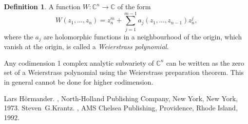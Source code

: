 \documentclass[12pt]{article}
\theoremstyle{theorem}
\theoremstyle{definition}
\newtheorem*{defn}{Definition}
\theoremstyle{remark}
\begin{document}
\begin{defn}
A function $W\colon {\mathbb{C}}^n \to {\mathbb{C}}$ of the form
\begin{equation*}
W(z_1,\ldots,z_n) = z_n^m + \sum_{j=1}^{m-1}a_j(z_1,\ldots,z_{n-1})z_n^j ,
\end{equation*}
where the $a_j$ are holomorphic functions in a neighbourhood of the origin, which vanish at the origin,
is called a {\em Weierstrass polynomial}.
\end{defn}

Any codimension 1 complex analytic subvariety of ${\mathbb{C}}^n$ can be written as the zero set
of a Weierstrass polynomial using the Weierstrass preparation theorem.  This in general cannot be done for higher codimension.

\begin{thebibliography}{9}
Lars H\"ormander.
{\em {}},
North-Holland Publishing Company, New York, New York, 1973.
Steven~G.\@ Krantz.
{\em {}},
AMS Chelsea Publishing, Providence, Rhode Island, 1992.
\end{thebibliography}
\end{document}
